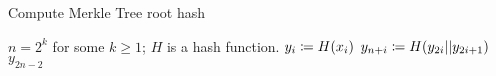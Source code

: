 \begin{algorithm}[p]
\caption{Compute Merkle Tree root hash}
\label{alg:merkle_tree}
\begin{algorithmic}[1]
\Require $n = 2^{k}$ for some $k\ge1$; $H$ is a \gls{hash function}.
        \State $y_{i} \coloneqq{} H(x_{i})$
    \EndFor
        \State $y_{n+i} \coloneqq{} H(y_{2i}||y_{2i+1})$
    \EndFor
    \State \Return $y_{2n-2}$
\EndProcedure
\end{algorithmic}
\end{algorithm}
